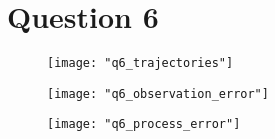 \documentclass{article}[12 pt]
\begin{document}
\section*{Question 6}

\begin{center}
	\begin{figure}[h]
		\centering
		\texttt{[image: "q6\_trajectories"]}
		\caption{ }
		\label{fig:q6_trajectories}
	\end{figure}
\end{center}

\begin{center}
	\begin{figure}[h]
		\centering
		\texttt{[image: "q6\_observation\_error"]}
		\caption{ }
		\label{fig:q6_observation_error}
	\end{figure}
\end{center}

\begin{center}
	\begin{figure}[h]
		\centering
		\texttt{[image: "q6\_process\_error"]}
		\caption{ }
		\label{fig:q6_process_error}
	\end{figure}
\end{center}
\end{document}
